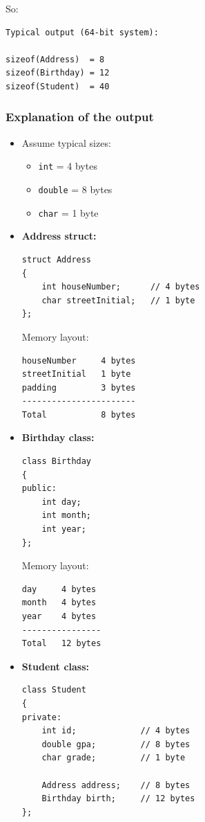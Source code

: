\documentclass[10pt]{article}
\begin{document}
\newpage

So:
\begin{verbatim}
Typical output (64-bit system):

sizeof(Address)  = 8
sizeof(Birthday) = 12
sizeof(Student)  = 40
\end{verbatim}

\subsubsection*{Explanation of the output}

\begin{itemize}
    \item Assume typical sizes:
    \begin{itemize}
        \item \verb|int| = 4 bytes
        \item \verb|double| = 8 bytes
        \item \verb|char| = 1 byte
    \end{itemize}

    \item \textbf{Address struct:}
\begin{verbatim}
struct Address
{
    int houseNumber;      // 4 bytes
    char streetInitial;   // 1 byte
};
\end{verbatim}

    Memory layout:
\begin{verbatim}
houseNumber     4 bytes
streetInitial   1 byte
padding         3 bytes
-----------------------
Total           8 bytes
\end{verbatim}

    \item \textbf{Birthday class:}
\begin{verbatim}
class Birthday
{
public:
    int day;
    int month;
    int year;
};
\end{verbatim}

    Memory layout:
\begin{verbatim}
day     4 bytes
month   4 bytes
year    4 bytes
----------------
Total   12 bytes
\end{verbatim}

    \item \textbf{Student class:}
\begin{verbatim}
class Student
{
private:
    int id;             // 4 bytes
    double gpa;         // 8 bytes
    char grade;         // 1 byte

    Address address;    // 8 bytes
    Birthday birth;     // 12 bytes
};
\end{verbatim}


\end{itemize}
\end{document}
